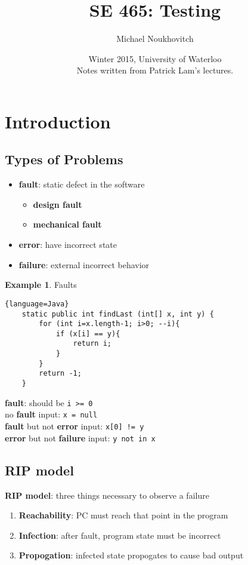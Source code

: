 \documentclass[]{article}
\theoremstyle{definition}
\newtheorem{ex}{Example}[section]
\begin{document}
	\let\ref\Cref

	\title{\bf{SE 465: Testing}}
	\date{Winter 2015, University of Waterloo \\ \center Notes written from Patrick Lam's lectures.}
	\author{Michael Noukhovitch}

	\maketitle
	\newpage
	\tableofcontents
	\newpage

	\section{Introduction}
		\subsection{Types of Problems}
			\begin{itemize}
				\item \textbf{fault}: static defect in the software
				\begin{itemize}
					\item \textbf{design fault}
					\item \textbf{mechanical fault}
				\end{itemize}				 
				\item \textbf{error}: have incorrect state
				\item \textbf{failure}: external incorrect behavior
			\end{itemize}
			\begin{ex}
				Faults
				\begin{lstlisting}{language=Java}
	static public int findLast (int[] x, int y) {
		for (int i=x.length-1; i>0; --i){
	    	if (x[i] == y){
	        	return i;
	        }
	   	}
	   	return -1;
	}			
				\end{lstlisting}
				
				\textbf{fault}: should be \lstinline|i >= 0| \\
				no \textbf{fault} input: \lstinline|x = null| \\
				\textbf{fault} but not \textbf{error} input: \lstinline|x[0] != y| \\
				\textbf{error} but not \textbf{failure} input: \lstinline|y not in x|
			\end{ex}
		\subsection{RIP model}
			\textbf{RIP model}: three things necessary to observe a failure
			\begin{enumerate}
				\item \textbf{Reachability}: PC must reach that point in the program
				\item \textbf{Infection}: after fault, program state must be incorrect
				\item \textbf{Propogation}: infected state propogates to cause bad output
			\end{enumerate}
\end{document}
